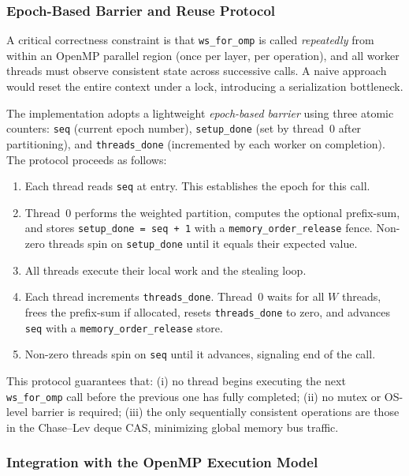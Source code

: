 \documentclass[11pt,english]{article}
\begin{document}
\subsubsection{Epoch-Based Barrier and Reuse Protocol}
 
A critical correctness constraint is that \texttt{ws\_for\_omp} is called \emph{repeatedly} from within an OpenMP parallel region (once per layer, per operation), and all worker threads must observe consistent state across successive calls. A naive approach would reset the entire context under a lock, introducing a serialization bottleneck.
 
The implementation adopts a lightweight \emph{epoch-based barrier} using three atomic counters: \texttt{seq} (current epoch number), \texttt{setup\_done} (set by thread~0 after partitioning), and \texttt{threads\_done} (incremented by each worker on completion). The protocol proceeds as follows:
 
\begin{enumerate}
    \item Each thread reads \texttt{seq} at entry. This establishes the epoch for this call.
    \item Thread~0 performs the weighted partition, computes the optional prefix-sum, and stores \texttt{setup\_done = seq + 1} with a \texttt{memory\_order\_release} fence. Non-zero threads spin on \texttt{setup\_done} until it equals their expected value.
    \item All threads execute their local work and the stealing loop.
    \item Each thread increments \texttt{threads\_done}. Thread~0 waits for all $W$ threads, frees the prefix-sum if allocated, resets \texttt{threads\_done} to zero, and advances \texttt{seq} with a \texttt{memory\_order\_release} store.
    \item Non-zero threads spin on \texttt{seq} until it advances, signaling end of the call.
\end{enumerate}
 
This protocol guarantees that: (i) no thread begins executing the next \texttt{ws\_for\_omp} call before the previous one has fully completed; (ii) no mutex or OS-level barrier is required; (iii) the only sequentially consistent operations are those in the Chase--Lev deque CAS, minimizing global memory bus traffic.
 
\subsubsection{Integration with the OpenMP Execution Model}
 
\end{document}
